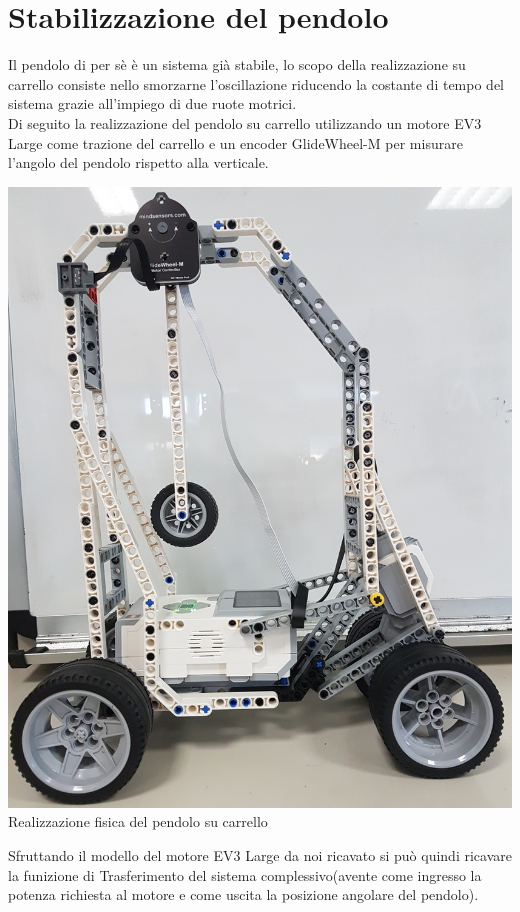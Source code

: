 \section{Stabilizzazione del pendolo}
Il pendolo di per sè è un sistema già stabile, lo scopo della realizzazione su carrello consiste nello smorzarne l'oscillazione riducendo la costante di tempo del sistema grazie all'impiego di due ruote motrici.\\
Di seguito la realizzazione del pendolo su carrello utilizzando un motore EV3 Large come trazione del carrello e un encoder GlideWheel-M per misurare l'angolo del pendolo rispetto alla verticale.
\begin{center}
	\includegraphics[scale=0.1]{pendoloFisico.jpg}\\
	{\small  Realizzazione fisica del pendolo su carrello}
\end{center}
Sfruttando il modello del motore EV3 Large da noi ricavato si può quindi ricavare la funizione di Trasferimento del sistema complessivo(avente come ingresso la potenza richiesta al motore e come uscita la posizione angolare del pendolo).\\

